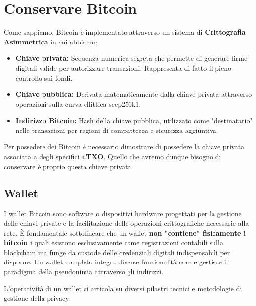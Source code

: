 \section{Conservare Bitcoin}
Come sappiamo, Bitcoin è implementato attraverso un sistema di \textbf{Crittografia Asimmetrica} in cui abbiamo:
\begin{itemize}
    \item \textbf{Chiave privata:} Sequenza numerica segreta che permette di generare firme digitali valide per autorizzare transazioni. Rappresenta di fatto il pieno controllo sui fondi.
    \item \textbf{Chiave pubblica:} Derivata matematicamente dalla chiave privata attraverso operazioni sulla curva ellittica secp256k1.
    \item \textbf{Indirizzo Bitcoin:} Hash della chiave pubblica, utilizzato come "destinatario" nelle transazioni per ragioni di compattezza e sicurezza aggiuntiva.
\end{itemize}
Per possedere dei Bitcoin è necessario dimostrare di possedere la chiave privata associata a degli specifici \textbf{uTXO}. Quello che avremo dunque bisogno di conservare è proprio questa chiave privata.

\subsection{Wallet}
I wallet Bitcoin sono software o dispositivi hardware progettati per la gestione delle chiavi private e la facilitazione delle operazioni crittografiche necessarie alla rete. 
È fondamentale sottolineare che un wallet \textbf{non "contiene" fisicamente i bitcoin} i quali esistono esclusivamente come registrazioni contabili sulla blockchain ma funge da custode delle credenziali digitali indispensabili per disporne. Un wallet completo integra diverse funzionalità core e gestisce il paradigma della pseudonimia attraverso gli indirizzi.

L'operatività di un wallet si articola su diversi pilastri tecnici e metodologie di gestione della privacy:

